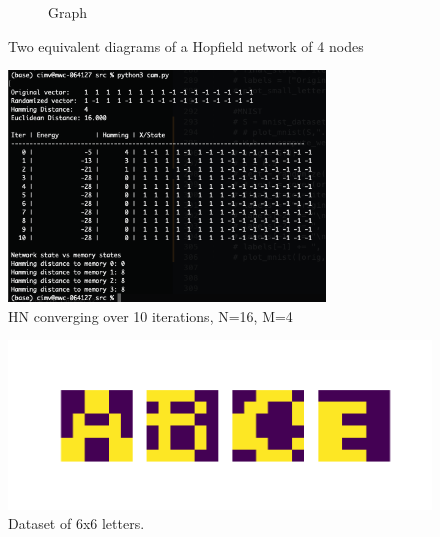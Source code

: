 \documentclass[11pt]{article}
\begin{document}
\begin{figure}[h]
\begin{center}
\begin{subfigure}{0.4\textwidth}
	\caption{Graph}
	\label{fig:netgraph}
	\end{subfigure}
	\caption{Two equivalent diagrams of a Hopfield network of 4 nodes}
	\label{fig:net}
	\end{center}
	\end{figure}

	
	\begin{figure}[h!]
	\begin{center}
	\includegraphics[width=0.75\textwidth]{../img/log_vector_good.png}
	\end{center}
	\caption{HN converging over 10 iterations, N=16, M=4}
	\label{fig:vector_log}	
	\end{figure}

	\begin{figure}
	\begin{center}
	\includegraphics[width=1\textwidth]{../img/small_letters.png}
	\caption{Dataset of 6x6 letters.}
	\label{fig:letters}
	\end{center}	
	\end{figure}
\end{document}
